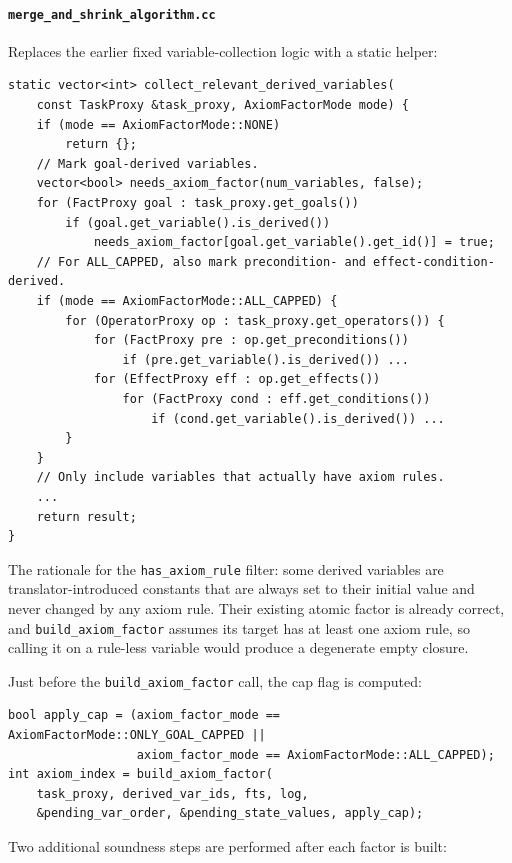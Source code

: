 \documentclass[11pt,a4paper]{article}
\begin{document}
\paragraph{\texttt{merge\_and\_shrink\_algorithm.cc}}

Replaces the earlier fixed variable-collection logic with a static helper:
\begin{lstlisting}
static vector<int> collect_relevant_derived_variables(
    const TaskProxy &task_proxy, AxiomFactorMode mode) {
    if (mode == AxiomFactorMode::NONE)
        return {};
    // Mark goal-derived variables.
    vector<bool> needs_axiom_factor(num_variables, false);
    for (FactProxy goal : task_proxy.get_goals())
        if (goal.get_variable().is_derived())
            needs_axiom_factor[goal.get_variable().get_id()] = true;
    // For ALL_CAPPED, also mark precondition- and effect-condition-derived.
    if (mode == AxiomFactorMode::ALL_CAPPED) {
        for (OperatorProxy op : task_proxy.get_operators()) {
            for (FactProxy pre : op.get_preconditions())
                if (pre.get_variable().is_derived()) ...
            for (EffectProxy eff : op.get_effects())
                for (FactProxy cond : eff.get_conditions())
                    if (cond.get_variable().is_derived()) ...
        }
    }
    // Only include variables that actually have axiom rules.
    ...
    return result;
}
\end{lstlisting}

The rationale for the \texttt{has\_axiom\_rule} filter: some derived variables
are translator-introduced constants that are always set to their initial value
and never changed by any axiom rule.  Their existing atomic factor is already
correct, and \texttt{build\_axiom\_factor} assumes its target has at least one
axiom rule, so calling it on a rule-less variable would produce a degenerate
empty closure.

Just before the \texttt{build\_axiom\_factor} call, the cap flag is computed:
\begin{lstlisting}
bool apply_cap = (axiom_factor_mode == AxiomFactorMode::ONLY_GOAL_CAPPED ||
                  axiom_factor_mode == AxiomFactorMode::ALL_CAPPED);
int axiom_index = build_axiom_factor(
    task_proxy, derived_var_ids, fts, log,
    &pending_var_order, &pending_state_values, apply_cap);
\end{lstlisting}

Two additional soundness steps are performed after each factor is built:
\end{document}
